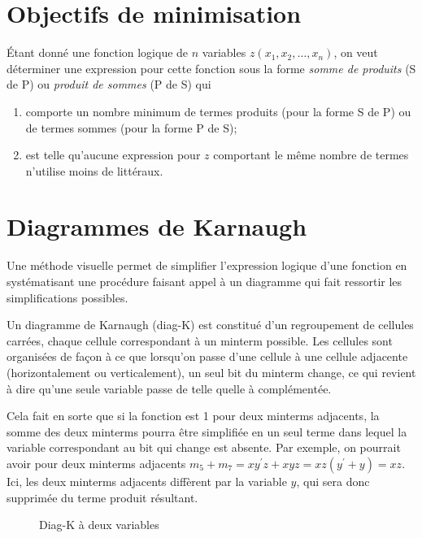 \documentclass[letter, oneside]{book}
\begin{document}
\section{Objectifs de minimisation}
\label{sec:org6f48f4c}

Étant donné une fonction logique de \(n\) variables \(z(x_1, x_2, \ldots,
x_n)\), on veut déterminer une expression pour cette fonction sous la
forme \emph{somme de produits} (S de P) ou \emph{produit de sommes} (P de S) qui

\begin{enumerate}
\item comporte un nombre minimum de termes produits (pour la forme S de P)
ou de termes sommes (pour la forme P de S);

\item est telle qu'aucune expression pour \(z\) comportant le même nombre
de termes n'utilise moins de littéraux.
\end{enumerate}

\section{Diagrammes de Karnaugh}
\label{sec:orgc002cb6}

Une méthode visuelle permet de simplifier l'expression logique d'une
fonction en systématisant une procédure faisant appel à un diagramme
qui fait ressortir les simplifications possibles.

Un diagramme de Karnaugh (diag-K) est constitué d'un regroupement de
cellules carrées, chaque cellule correspondant à un minterm
possible. Les cellules sont organisées de façon à ce que lorsqu'on
passe d'une cellule à une cellule adjacente (horizontalement ou
verticalement), un seul bit du minterm change, ce qui revient à dire
qu'une seule variable passe de telle quelle à complémentée.

Cela fait en sorte que si la fonction est 1 pour deux minterms
adjacents, la somme des deux minterms pourra être simplifiée en un
seul terme dans lequel la variable correspondant au bit qui change est
absente. Par exemple, on pourrait avoir pour deux minterms adjacents
\(m_5 + m_7 = xy^\prime z + xyz = xz(y^\prime + y) = xz\). Ici, les
deux minterms adjacents diffèrent par la variable \(y\), qui sera donc
supprimée du terme produit résultant.

\begin{figure}[htbp]
\centering

\caption{\label{fig:orgc915756}Diag-K à deux variables}
\end{figure}
\end{document}

